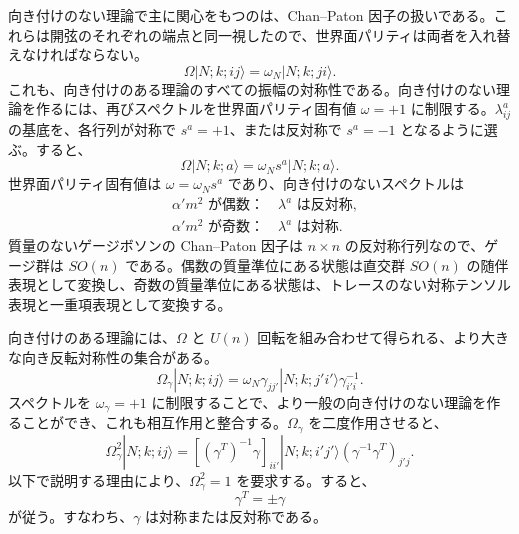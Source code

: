 向き付けのない理論で主に関心をもつのは、Chan--Paton 因子の扱いである。これらは開弦のそれぞれの端点と同一視したので、世界面パリティは両者を入れ替えなければならない。
\begin{equation}
\Omega|N;k;ij\rangle=\omega_N|N;k;ji\rangle .
\tag{6.5.22}\label{eq:6.5.22}
\end{equation}
これも、向き付けのある理論のすべての振幅の対称性である。向き付けのない理論を作るには、再びスペクトルを世界面パリティ固有値 $\omega=+1$ に制限する。$\lambda^a_{ij}$ の基底を、各行列が対称で $s^a=+1$、または反対称で $s^a=-1$ となるように選ぶ。すると、
\begin{equation}
\Omega|N;k;a\rangle=\omega_Ns^a|N;k;a\rangle .
\tag{6.5.23}\label{eq:6.5.23}
\end{equation}
世界面パリティ固有値は $\omega=\omega_Ns^a$ であり、向き付けのないスペクトルは
\begin{align}
&\alpha'm^2\text{ が偶数：}\quad \lambda^a\text{ は反対称},
\tag{6.5.24a}\label{eq:6.5.24a}\\
&\alpha'm^2\text{ が奇数：}\quad \lambda^a\text{ は対称}.
\tag{6.5.24b}\label{eq:6.5.24b}
\end{align}
質量のないゲージボソンの Chan--Paton 因子は $n\times n$ の反対称行列なので、ゲージ群は $SO(n)$ である。偶数の質量準位にある状態は直交群 $SO(n)$ の随伴表現として変換し、奇数の質量準位にある状態は、トレースのない対称テンソル表現と一重項表現として変換する。

向き付けのある理論には、$\Omega$ と $U(n)$ 回転を組み合わせて得られる、より大きな向き反転対称性の集合がある。
\begin{equation}
\Omega_\gamma|N;k;ij\rangle
=\omega_N\gamma_{jj'}|N;k;j'i'\rangle\gamma^{-1}_{i'i}.
\tag{6.5.25}\label{eq:6.5.25}
\end{equation}
スペクトルを $\omega_\gamma=+1$ に制限することで、より一般の向き付けのない理論を作ることができ、これも相互作用と整合する。$\Omega_\gamma$ を二度作用させると、
\begin{equation}
\Omega_\gamma^2|N;k;ij\rangle
=[(\gamma^T)^{-1}\gamma]_{ii'}|N;k;i'j'\rangle
(\gamma^{-1}\gamma^T)_{j'j}.
\tag{6.5.26}\label{eq:6.5.26}
\end{equation}
以下で説明する理由により、$\Omega_\gamma^2=1$ を要求する。すると、
\begin{equation}
\gamma^T=\pm\gamma
\tag{6.5.27}\label{eq:6.5.27}
\end{equation}
が従う。すなわち、$\gamma$ は対称または反対称である。

